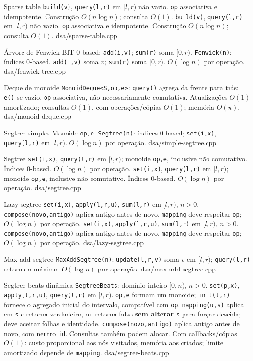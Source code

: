 \fi

\templateentry
{Sparse table}
{\texttt{build(v)}, \texttt{query(l,r)} em $[l,r)$ não vazio. \texttt{op} associativa e idempotente. Construção $O(n\log n)$; consulta $O(1)$.}
{\texttt{build(v)}, \texttt{query(l,r)} em $[l,r)$ não vazio. \texttt{op} associativa e idempotente. Construção $O(n\log n)$; consulta $O(1)$.}
{dsa/sparse-table.cpp}

\ifextended

\templateentry
{Árvore de Fenwick}
{BIT 0-based: \texttt{add(i,v)}; \texttt{sum(r)} soma $[0,r)$.}
{\texttt{Fenwick(n)}: índices 0-based. \texttt{add(i,v)} soma $v$; \texttt{sum(r)} soma $[0,r)$. $O(\log n)$ por operação.}
{dsa/fenwick-tree.cpp}

\templateentry
{Deque de monoide}
{}
{\texttt{MonoidDeque<S,op,e>}: \texttt{query()} agrega da frente para trás; \texttt{e()} se vazio. \texttt{op} associativa, não necessariamente comutativa. Atualizações $O(1)$ amortizado; consultas $O(1)$, com operações/cópias $O(1)$; memória $O(n)$.}
{dsa/monoid-deque.cpp}

\templateentry
{Segtree simples}
{}
{Monoide \texttt{op,e}. \texttt{Segtree(n)}: índices 0-based; \texttt{set(i,x)}, \texttt{query(l,r)} em $[l,r)$. $O(\log n)$ por operação.}
{dsa/simple-segtree.cpp}

\fi

\templateentry
{Segtree}
{\texttt{set(i,x)}, \texttt{query(l,r)} em $[l,r)$; monoide \texttt{op,e}, inclusive não comutativo. Índices 0-based. $O(\log n)$ por operação.}
{\texttt{set(i,x)}, \texttt{query(l,r)} em $[l,r)$; monoide \texttt{op,e}, inclusive não comutativo. Índices 0-based. $O(\log n)$ por operação.}
{dsa/segtree.cpp}

\templateentry
{Lazy segtree}
{\texttt{set(i,x)}, \texttt{apply(l,r,u)}, \texttt{sum(l,r)} em $[l,r)$, $n>0$. \texttt{compose(novo,antigo)} aplica antigo antes de novo. \texttt{mapping} deve respeitar \texttt{op}; $O(\log n)$ por operação.}
{\texttt{set(i,x)}, \texttt{apply(l,r,u)}, \texttt{sum(l,r)} em $[l,r)$, $n>0$. \texttt{compose(novo,antigo)} aplica antigo antes de novo. \texttt{mapping} deve respeitar \texttt{op}; $O(\log n)$ por operação.}
{dsa/lazy-segtree.cpp}

\ifextended

\templateentry
{Max add segtree}
{}
{\texttt{MaxAddSegtree(n)}: \texttt{update(l,r,v)} soma $v$ em $[l,r)$; \texttt{query(l,r)} retorna o máximo. $O(\log n)$ por operação.}
{dsa/max-add-segtree.cpp}

\templateentry
{Segtree beats dinâmica}
{}
{\texttt{SegtreeBeats}: domínio inteiro $[0,n)$, $n>0$. \texttt{set(p,x)}, \texttt{apply(l,r,u)}, \texttt{query(l,r)} em $[l,r)$. \texttt{op,e} formam um monoide; \texttt{init(l,r)} fornece o agregado inicial do intervalo, compatível com \texttt{op}. \texttt{mapping(u,s)} aplica em \texttt{s} e retorna verdadeiro, ou retorna falso \textbf{sem alterar} \texttt{s} para forçar descida; deve aceitar folhas e identidade. \texttt{compose(novo,antigo)} aplica antigo antes de novo, com neutro \texttt{id}. Consultas também podem alocar. Com callbacks/cópias $O(1)$: custo proporcional aos nós visitados, memória aos criados; limite amortizado depende de \texttt{mapping}.}
{dsa/segtree-beats.cpp}

